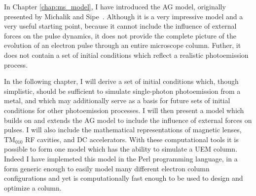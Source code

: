 In Chapter \ref{chap:ms_model}, I have introduced the AG model, originally presented by Michalik and Sipe~\cite{michalik_analytic_2006}.
Although it is a very impressive model and a very useful starting point, because it cannot include the influence of external forces on the pulse dynamics, it does not provide the complete picture of the evolution of an electron pulse through an entire microscope column.
Futher, it does not contain a set of initial conditions which reflect a realistic photoemission process.

In the following chapter, I will derive a set of initial conditions which, though simplistic, should be sufficient to simulate single-photon photoemission from a metal, and which may additionally serve as a basis for future sets of initial conditions for other photoemission processes.
I will then present a model which builds on and extends the AG model to include the influence of external forces on pulses.
I will also include the mathematical representations of magnetic lenses, TM$_{010}$ RF cavities, and DC accelerators.
With these computational tools it is possible to form one model which has the ability to simulate a UEM column.
Indeed I have implemeted this model in the Perl programming language, in a form generic enough to easily model many different electron column configurations and yet is computationally fast enough to be used to design and optimize a column.

